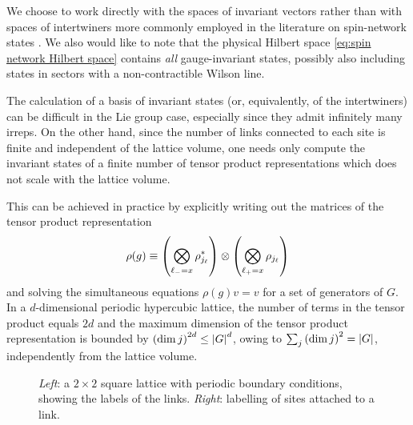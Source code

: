 We choose to work directly with the spaces of invariant vectors rather than with spaces of intertwiners more commonly employed in the literature on spin-network states \cite{baez1996spinnetworks, burgio2000physical}.
We also would like to note that the physical Hilbert space \eqref{eq:spin network Hilbert space} contains \emph{all} gauge-invariant states, possibly also including states in sectors with a non-contractible Wilson line.

\medskip

The calculation of a basis of invariant states (or, equivalently, of the intertwiners) can be difficult in the Lie group case, especially since they admit infinitely many irreps.
On the other hand, since the number of links connected to each site is finite and independent of the lattice volume, one needs only compute the invariant states of a finite number of tensor product representations which does not scale with the lattice volume.

This can be achieved in practice by explicitly writing out the matrices of the tensor product representation
\begin{equation*}
    \rho(g) \equiv \pqty{\bigotimes_{\link_{-}=x} \rho_{j_{\link}}^*} \otimes \pqty{\bigotimes_{\link_{+}=x} \rho_{j_{\link}} }
\end{equation*}
and solving the simultaneous equations $\rho(g) v = v$ for a set of generators of $G$.
In a $d$-dimensional periodic hypercubic lattice, the number of terms in the tensor product equals $2d$ and the maximum dimension of the tensor product representation is bounded by $\pqty{\dim{j}}^{2d} \leq \abs{G}^d$, owing to $\sum_j \pqty{\dim{j}}^2 = \abs{G}$, independently from the lattice volume.

\bigbreak

\begin{figure}[t]
    \centering
    
    \caption[Periodic square $2 \times 2$ lattice]{\emph{Left}: a $2\times 2$ square lattice with periodic boundary conditions, showing the labels of the links.
        \emph{Right}: labelling of sites attached to a link.}
    \label{fig:periodic plaquette}
\end{figure}

